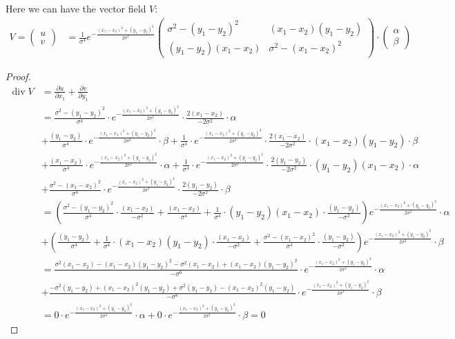 \documentclass{article}
\theoremstyle{definition}
\theoremstyle{plain}
\begin{document}
Here we can have the vector field $V$:
\begin{align}
    V=
    \begin{pmatrix}
        u\\
        v
    \end{pmatrix}
    &=\frac{1}{\sigma^4}e^{-\frac{(x_1-x_2)^2+(y_1-y_2)^2}{2\sigma^2}}
    \begin{pmatrix}
    \sigma^2-(y_1-y_2)^2 & (x_1-x_2)(y_1-y_2)\\
    (y_1-y_2)(x_1-x_2) & \sigma^2-(x_1-x_2)^2
    \end{pmatrix}
    \cdot
    \begin{pmatrix}
    \alpha\\
    \beta
    \end{pmatrix}
    \label{divfree}
\end{align}

\begin{proof}
\begin{align*}
    \operatorname{div} V&=\frac{\partial u}{\partial x_1}+\frac{\partial v}{\partial y_1}\\
    &=\frac{\sigma^2-(y_1-y_2)^2}{\sigma^4}\cdot e^{-\frac{(x_1-x_2)^2+(y_1-y_2)^2}{2\sigma^2}}\cdot\frac{2(x_1-x_2)}{-2\sigma^2}\cdot\alpha\\
    &+\frac{(y_1-y_2)}{\sigma^4}\cdot e^{-\frac{(x_1-x_2)^2+(y_1-y_2)^2}{2\sigma^2}}\cdot\beta+\frac{1}{\sigma^4}\cdot e^{-\frac{(x_1-x_2)^2+(y_1-y_2)^2}{2\sigma^2}}\cdot\frac{2(x_1-x_2)}{-2\sigma^2}\cdot (x_1-x_2)(y_1-y_2)\cdot\beta\\
    &+\frac{(x_1-x_2)}{\sigma^4}\cdot e^{-\frac{(x_1-x_2)^2+(y_1-y_2)^2}{2\sigma^2}}\cdot\alpha+\frac{1}{\sigma^4}\cdot e^{-\frac{(x_1-x_2)^2+(y_1-y_2)^2}{2\sigma^2}}\cdot\frac{2(y_1-y_2)}{-2\sigma^2}\cdot (y_1-y_2)(x_1-x_2)\cdot\alpha\\
    &+\frac{\sigma^2-(x_1-x_2)^2}{\sigma^4}\cdot e^{-\frac{(x_1-x_2)^2+(y_1-y_2)^2}{2\sigma^2}}\cdot\frac{2(y_1-y_2)}{-2\sigma^2}\cdot\beta\\
    &=\left(\frac{\sigma^2-(y_1-y_2)^2}{\sigma^4}\cdot\frac{(x_1-x_2)}{-\sigma^2}+\frac{(x_1-x_2)}{\sigma^4}+\frac{1}{\sigma^4}\cdot (y_1-y_2)(x_1-x_2)\cdot\frac{(y_1-y_2)}{-\sigma^2}\right)e^{-\frac{(x_1-x_2)^2+(y_1-y_2)^2}{2\sigma^2}}\cdot\alpha\\
    &+\left(\frac{(y_1-y_2)}{\sigma^4}+\frac{1}{\sigma^4}\cdot (x_1-x_2)(y_1-y_2)\cdot\frac{(x_1-x_2)}{-\sigma^2}+\frac{\sigma^2-(x_1-x_2)^2}{\sigma^4}\cdot\frac{(y_1-y_2)}{-\sigma^2}\right)e^{-\frac{(x_1-x_2)^2+(y_1-y_2)^2}{2\sigma^2}}\cdot\beta\\
    &=\frac{\sigma^2(x_1-x_2)-(x_1-x_2)(y_1-y_2)^2-\sigma^2(x_1-x_2)+(x_1-x_2)(y_1-y_2)^2}{-\sigma^6}\cdot e^{-\frac{(x_1-x_2)^2+(y_1-y_2)^2}{2\sigma^2}}\cdot\alpha\\
    &+\frac{-\sigma^2(y_1-y_2)+(x_1-x_2)^2(y_1-y_2)+\sigma^2(y_1-y_2)-(x_1-x_2)^2(y_1-y_2)}{-\sigma^6}\cdot e^{-\frac{(x_1-x_2)^2+(y_1-y_2)^2}{2\sigma^2}}\cdot\beta\\
    &=0\cdot e^{-\frac{(x_1-x_2)^2+(y_1-y_2)^2}{2\sigma^2}}\cdot\alpha+0\cdot e^{-\frac{(x_1-x_2)^2+(y_1-y_2)^2}{2\sigma^2}}\cdot\beta=0
\end{align*}
\end{proof}
\end{document}
